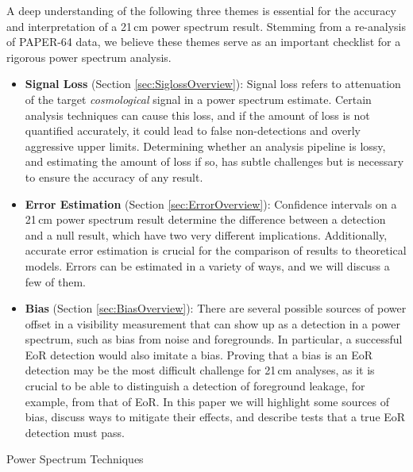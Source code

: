 \documentclass[preprint2,numberedappendix,tighten]{aastex6}
\begin{document}
A deep understanding of the following three themes is essential for the accuracy and interpretation of a 21\,cm power 
spectrum result. Stemming from a re-analysis of PAPER-64 data, we believe these themes serve as an important checklist for 
a rigorous power spectrum analysis.
\begin{itemize}
\item \textbf{Signal Loss} (Section \ref{sec:SiglossOverview}): Signal loss refers to attenuation of the target \textit{cosmological} signal 
in a power spectrum estimate. Certain analysis techniques can cause this loss, and if the amount of loss is not quantified accurately, it could lead to false non-detections and overly aggressive upper limits. Determining whether an analysis pipeline is lossy, and estimating the amount of loss if so, has subtle challenges but is necessary to ensure the accuracy of any result. 
\item \textbf{Error Estimation} (Section \ref{sec:ErrorOverview}): Confidence intervals on a 21\,cm power spectrum result 
determine the difference between a detection and a null result, which have two very different implications. Additionally, accurate error estimation is crucial for the comparison of results to theoretical models. Errors can be 
estimated in a variety of ways, and we will discuss a few of them.
\item \textbf{Bias} (Section \ref{sec:BiasOverview}): There are several possible sources of power offset in a visibility 
measurement that can show up as a detection in a power spectrum, such as bias from noise and foregrounds. In particular, a 
successful EoR detection would also imitate a bias. Proving that a bias is an EoR detection may be the most difficult challenge for 21\,cm 
analyses, as it is crucial to be able to distinguish a detection of foreground leakage, for example, from that of EoR. In this paper 
we will highlight some sources of bias, discuss ways to mitigate their effects, and describe tests that a true EoR detection must 
pass.
\end{itemize}

\begin{center}
Power Spectrum Techniques
\end{center}
\end{document}
